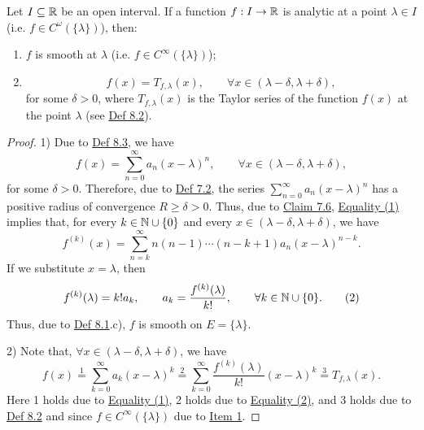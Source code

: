 \begin{claim}\label{claim:8.1}
Let $I\subseteq\mathbb{R}$ be an open interval.
If a function $f:I\to\mathbb{R}$ is analytic at a point $\lambda\in I$ (i.e. $f\in C^\omega(\{\lambda\})$), then:
\begin{enumerate}
    \item\label{item:claim:8.1:1} $f$ is smooth at $\lambda$ (i.e. $f\in C^\infty(\{\lambda\})$);
    \item\label{item:claim:8.1:2}
    \[
    f(x)=T_{f,\lambda}(x),\qquad \forall x\in(\lambda-\delta,\lambda+\delta),
    \]
    for some $\delta>0$, where $T_{f,\lambda}(x)$ is the Taylor series of the function $f(x)$ at the point $\lambda$ (see \hyperref[def:8.2]{Def 8.2}).
\end{enumerate}
\end{claim}

\begin{proof}
1) Due to \hyperref[def:8.3]{Def 8.3}, we have
\[
f(x)=\sum_{n=0}^{\infty}a_n(x-\lambda)^n,
\qquad \forall x\in(\lambda-\delta,\lambda+\delta),
\tag{1}\label{eq:8:1:2}
\]
for some $\delta>0$.
Therefore, due to \hyperref[def:7.2]{Def 7.2}, the series $\sum_{n=0}^{\infty}a_n(x-\lambda)^n$ has a positive radius of convergence $R\geq\delta>0$.
Thus, due to \hyperref[claim:7.6]{Claim 7.6}, \hyperref[eq:8:1:2]{Equality (1)} implies that, for every $k\in\mathbb{N}\cup\{0\}$ and every $x\in(\lambda-\delta,\lambda+\delta)$, we have
\[
f^{(k)}(x)
=\sum_{n=k}^{\infty}n(n-1)\cdots(n-k+1)a_n(x-\lambda)^{n-k}.
\]
If we substitute $x=\lambda$, then
\[
f^{(k)}(\lambda)=k!a_k,
\qquad a_k=\frac{f^{(k)}(\lambda)}{k!},
\qquad \forall k\in\mathbb{N}\cup\{0\}.
\tag{2}\label{eq:8:2:1}
\]
Thus, due to \hyperref[def:8.1]{Def 8.1}.c), $f$ is smooth on $E=\{\lambda\}$.

2) Note that, $\forall x\in(\lambda-\delta,\lambda+\delta)$, we have
\[
f(x)
\overset{1}{=}\sum_{k=0}^{\infty}a_k(x-\lambda)^k
\overset{2}{=}\sum_{k=0}^{\infty}\frac{f^{(k)}(\lambda)}{k!}(x-\lambda)^k
\overset{3}{=}T_{f,\lambda}(x).
\]
Here 1 holds due to \hyperref[eq:8:1:2]{Equality (1)}, 2 holds due to \hyperref[eq:8:2:1]{Equality (2)}, and 3 holds due to \hyperref[def:8.2]{Def 8.2} and since $f\in C^\infty(\{\lambda\})$ due to \hyperref[item:claim:8.1:1]{Item 1}.
\end{proof}

